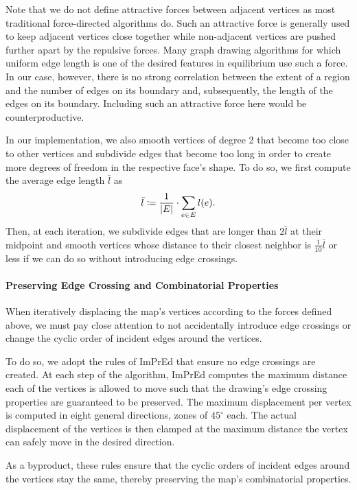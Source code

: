 Note that we do not define attractive forces between adjacent vertices as most traditional force-directed algorithms do.
Such an attractive force is generally used to keep adjacent vertices close together while non-adjacent vertices are pushed further apart by the repulsive forces.
Many graph drawing algorithms for which uniform edge length is one of the desired features in equilibrium use such a force.
In our case, however, there is no strong correlation between the extent of a region and the number of edges on its boundary and, subsequently, the length of the edges on its boundary.
Including such an attractive force here would be counterproductive.

In our implementation, we also smooth vertices of degree 2 that become too close to other vertices and subdivide edges that become too long in order to create more degrees of freedom in the respective face's shape.
To do so, we first compute the average edge length $\bar{l}$ as
%
\begin{equation*}
	\bar{l} \coloneqq \frac1{\left\lvert E\right\rvert} \cdot \sum\limits_{e \in E} l(e)
	.
\end{equation*}
%
Then, at each iteration, we subdivide edges that are longer than $2\bar{l}$ at their midpoint and smooth vertices whose distance to their closest neighbor is $\frac{1}{10}\bar{l}$ or less if we can do so without introducing edge crossings.



\paragraph{Preserving Edge Crossing and Combinatorial Properties}

When iteratively displacing the map's vertices according to the forces defined above, we must pay close attention to not accidentally introduce edge crossings or change the cyclic order of incident edges around the vertices.

To do so, we adopt the rules of ImPrEd \cite{simonetto2011impred} that ensure no edge crossings are created.
At each step of the algorithm, ImPrEd computes the maximum distance each of the vertices is allowed to move such that the drawing's edge crossing properties are guaranteed to be preserved.
The maximum displacement per vertex is computed in eight general directions, zones of $45^\circ$ each.
The actual displacement of the vertices is then clamped at the maximum distance the vertex can safely move in the desired direction.

As a byproduct, these rules ensure that the cyclic orders of incident edges around the vertices stay the same, thereby preserving the map's combinatorial properties.
